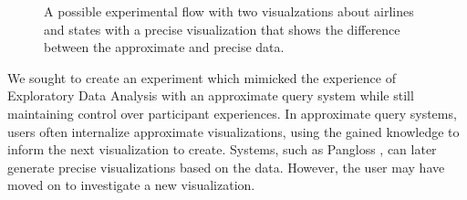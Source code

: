 \documentclass[10pt,journal,compsoc]{IEEEtran}
\begin{document}
\begin{figure}[!ht]
{\label{fig:five}}
\hfil
{}
\hfil
{}
\hfil
{}
\hfil
{}
\hfil

\caption{A possible experimental flow with two visualzations about airlines and states with a precise visualization that shows the difference between the approximate and precise data.}
\label{fig:example}
\end{figure}

We sought to create an experiment which mimicked the experience of Exploratory Data Analysis with an approximate query system while still maintaining control over participant experiences.
In approximate query systems, users often internalize approximate visualizations, using the gained knowledge to inform the next visualization to create.
Systems, such as Pangloss \cite{moritz2017pangloss}, can later generate precise visualizations based on the data.
However, the user may have moved on to investigate a new visualization.
\end{document}
